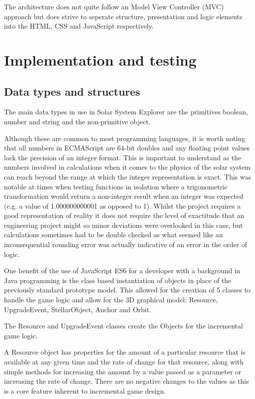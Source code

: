 \documentclass[twoside]{bhamthesis}
\begin{document}
The architecture does not quite follow an Model View Controller (MVC) approach but does strive to seperate structure, presentation and logic elements into the HTML, CSS and JavaScript respectively.

\section{Implementation and testing}

\subsection{Data types and structures}
The main data types in use in Solar System Explorer are the primitives boolean, number and string and the non-primitive object.

Although these are common to most programming languages, it is worth noting that all numbers in ECMAScript are 64-bit doubles and any floating point values lack the precision of an integer format. This is important to understand as the numbers involved in calculations when it comes to the physics of the solar system can reach beyond the range at which the integer representation is exact. This was notable at times when testing functions in isolation where a trigonometric transformation would return a non-integer result when an integer was expected (e.g. a value of 1.000000000001 as opposed to 1).  Whilst the project requires a good representation of reality it does not require the level of exactitude that an engineering project might so minor deviations were overlooked in this case, but calculations sometimes had to be double checked as what seemed like an inconsequential rounding error was actually  indicative of an error in the order of logic.

One benefit of the use of JavaScript ES6 for a developer with a background in Java programming is the class based instantiation of objects in place of the previously standard prototype model. This allowed for the creation of 5 classes to handle the game logic and allow for the 3D graphical model: Resource, UpgradeEvent, StellarObject, Anchor and Orbit.

The Resource and UpgradeEvent classes create the Objects for the incremental game logic.

A Resource object has properties for the amount of a particular resource that is available at any given time and the rate of change for that resource, along with simple methods for increasing the amount by a value passed as a parameter or increasing the rate of change. There are no negative changes to the values as this is a core feature inherent to incremental game design.
\end{document}
